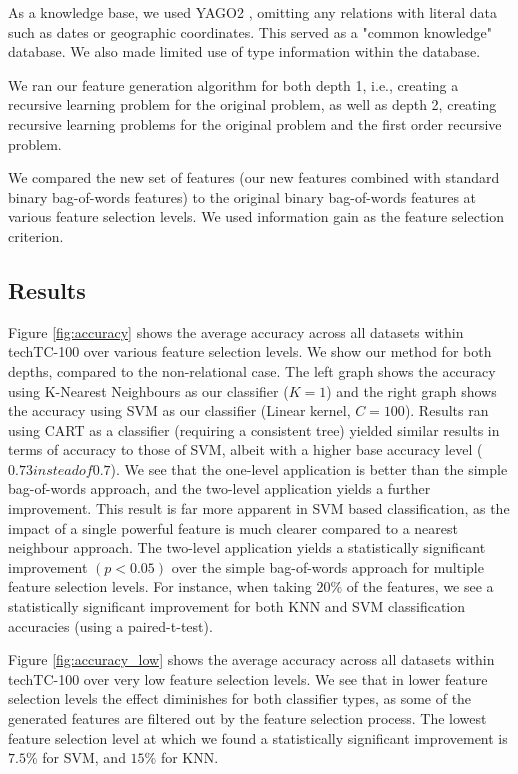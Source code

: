 \documentclass{article}
\theoremstyle{definition}
\begin{document}
As a knowledge base, we used YAGO2 \citep{hoffart2013yago2}, omitting any relations with literal data such as dates or geographic coordinates. This served as a "common knowledge" database. We also made limited use of type information within the database.

We ran our feature generation algorithm for both depth 1, i.e., creating a recursive learning problem for the original problem, as well as depth 2, creating recursive learning problems for the original problem and the first order recursive problem.

We compared the new set of features (our new features combined with standard binary bag-of-words features) to the original binary bag-of-words features at various feature selection levels. We used information gain as the feature selection criterion.
\subsection{Results}
Figure \ref{fig:accuracy} shows the average accuracy across all datasets within techTC-100 over various feature selection levels. We show our method for both depths, compared to the non-relational case.  The left graph shows the accuracy using K-Nearest Neighbours \citep{fix1951discriminatory} as our classifier ($K=1$) and the right graph shows the accuracy using SVM \citep{cortes1995support} as our classifier (Linear kernel, $C=100$). Results ran using CART \citep{steinberg2009cart} as a classifier (requiring a consistent tree) yielded similar results in terms of accuracy to those of SVM, albeit with a higher base accuracy level ($0.73 instead of 0.7$).
We see that the one-level application is better than the simple bag-of-words approach, and the two-level application yields a further improvement. This result is far more apparent in SVM based classification, as the impact of a single powerful feature is much clearer compared to a nearest neighbour approach. The two-level application yields a statistically significant improvement $ (p<0.05) $ over the simple bag-of-words approach for multiple feature selection levels. For instance, when taking $20\% $ of the features, we see a statistically significant improvement for both KNN and SVM classification accuracies (using a paired-t-test). 

Figure \ref{fig:accuracy_low} shows the average accuracy across all datasets within techTC-100 over very low feature selection levels. 
We see that in lower feature selection levels the effect diminishes for both classifier types, as some of the generated features are filtered out by the feature selection process. The lowest feature selection level at which we found a statistically significant improvement is $7.5\%$ for SVM, and $15\%$ for KNN.
\end{document}
